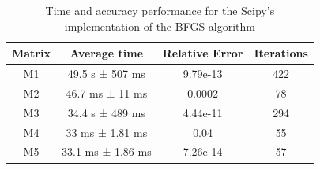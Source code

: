 \documentclass{article}
\numberwithin{equation}{section}
\begin{document}
\begin{table}[H]
    \centering
    \begin{tabular}{||c c c c||}
 \hline
 Matrix & Average time & Relative Error & Iterations \\ [0.8ex] 
 \hline\hline
 M1 & 49.5 s ± 507 ms & 9.79e-13  & 422 \\ 
 \hline
 M2 & 46.7 ms ± 11 ms & 0.0002 &  78\\ 
 \hline
 M3 & 34.4 s ± 489 ms & 4.44e-11 & 294 \\ 
 \hline
 M4 & 33 ms ± 1.81 ms & 0.04 & 55 \\ 
 \hline
 M5 & 33.1 ms ± 1.86 ms & 7.26e-14 & 57 \\ 
 \hline
 \end{tabular}
    \caption{Time and accuracy performance for the Scipy's implementation of the BFGS algorithm}
    \label{tab:performance_off_shelf}
\end{table}
\end{document}
